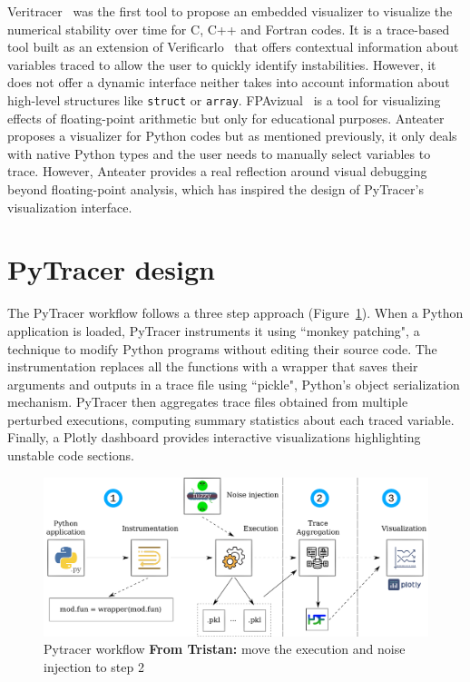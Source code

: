 \documentclass[11pt]{article}
\newcommand{\tristan}[1]{\color{orange}\textbf{From Tristan:} #1\color{black}\xspace}
\newcommand{\pytracer}[0]{PyTracer\xspace}
\begin{document}
Veritracer~\cite{chatelain2018veritracer} was the first tool to propose an embedded visualizer to 
visualize the numerical stability over time for C, C++ and Fortran codes.
It is a trace-based tool built as an extension of Verificarlo~\cite{verificarlo} that offers contextual 
information about variables traced to allow the user to quickly identify instabilities.
However, it does not offer a dynamic interface neither takes into account information about 
high-level structures like \texttt{struct} or \texttt{array}.
FPAvizual~\cite{gu2014fpavisual} is a tool for visualizing effects of floating-point arithmetic but only for educational purposes.
Anteater~\cite{faust2019anteater} proposes a visualizer for Python codes but as mentioned previously,
it only deals with native Python types and the user needs to manually select variables to trace. 
However, Anteater provides a real reflection around visual debugging beyond floating-point 
analysis, which has inspired the design of \pytracer's visualization interface.

\section{\pytracer design}


The PyTracer workflow follows a three step approach (Figure~\ref{fig:workflow}). When a Python application is loaded, \pytracer instruments it using ``monkey patching", a technique to modify Python programs without editing their source code. The instrumentation replaces all the functions with a wrapper that saves their arguments and outputs in a trace file using ``pickle", Python's object serialization mechanism. \pytracer then aggregates trace files obtained from multiple perturbed executions, computing summary statistics about each traced variable. Finally, a Plotly dashboard provides interactive visualizations highlighting unstable code sections.


\begin{figure}
    \centering
    \includegraphics[width=\linewidth]{figure/workflow.pdf}
    \caption{Pytracer workflow \tristan{move the execution and noise injection to step 2}}
    \label{fig:workflow}
\end{figure}
\end{document}
